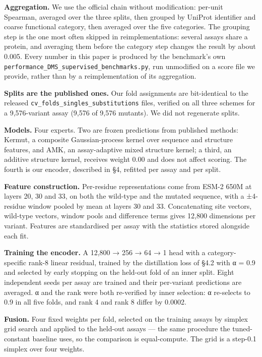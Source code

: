 \documentclass{article}
\begin{document}
\textbf{Aggregation.} We use the official chain without modification: per-unit Spearman, averaged over the
three splits, then grouped by UniProt identifier and coarse functional category, then averaged over the
five categories. The grouping step is the one most often skipped in reimplementations: several assays
share a protein, and averaging them before the category step changes the result by about 0.005. Every
number in this paper is produced by the benchmark's own
\texttt{performance\_DMS\_supervised\_benchmarks.py}, run unmodified on a score file we provide, rather than by a
reimplementation of its aggregation.

\textbf{Splits are the published ones.} Our fold assignments are bit-identical to the released
\texttt{cv\_folds\_singles\_substitutions} files, verified on all three schemes for a 9,576-variant assay
(9,576 of 9,576 mutants). We did not regenerate splits.

\textbf{Models.} Four experts. Two are frozen predictions from published methods: Kermut, a composite
Gaussian-process kernel over sequence and structure features, and AMK, an assay-adaptive mixed structure
kernel; a third, an additive structure kernel, receives weight 0.00 and does not affect scoring. The
fourth is our encoder, described in §4, refitted per assay and per split.

\textbf{Feature construction.} Per-residue representations come from ESM-2 650M at layers 20, 30 and 33, on
both the wild-type and the mutated sequence, with a ±4-residue window pooled by mean at layers 30 and
33. Concatenating site vectors, wild-type vectors, window pools and difference terms gives 12,800
dimensions per variant. Features are standardised per assay with the statistics stored alongside each
fit.

\textbf{Training the encoder.} A 12,800 → 256 → 64 → 1 head with a category-specific rank-8 linear residual,
trained by the distillation loss of §4.2 with α = 0.9 and selected by early stopping on the held-out
fold of an inner split. Eight independent seeds per assay are trained and their per-variant predictions
are averaged. α and the rank were both re-verified by inner selection: α re-selects to 0.9 in all five
folds, and rank 4 and rank 8 differ by 0.0002.

\textbf{Fusion.} Four fixed weights per fold, selected on the training assays by simplex grid search and
applied to the held-out assays --- the same procedure the tuned-constant baseline uses, so the comparison
is equal-compute. The grid is a step-0.1 simplex over four weights.
\end{document}
